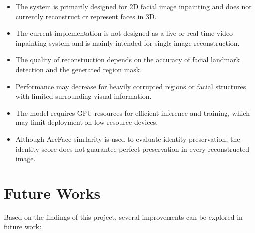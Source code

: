 \begin{itemize}
    \item The system is primarily designed for 2D facial image inpainting
    and does not currently reconstruct or represent faces in 3D.
    
    \item The current implementation is not designed as a live or
    real-time video inpainting system and is mainly intended for
    single-image reconstruction.
    
    \item The quality of reconstruction depends on the accuracy of facial
    landmark detection and the generated region mask.
    
    \item Performance may decrease for heavily corrupted regions or
    facial structures with limited surrounding visual information.
    
    \item The model requires GPU resources for efficient inference and
    training, which may limit deployment on low-resource devices.
    
    \item Although ArcFace similarity is used to evaluate identity
    preservation, the identity score does not guarantee perfect
    preservation in every reconstructed image.
\end{itemize}

\section{Future Works}

Based on the findings of this project, several improvements can be explored
in future work:


